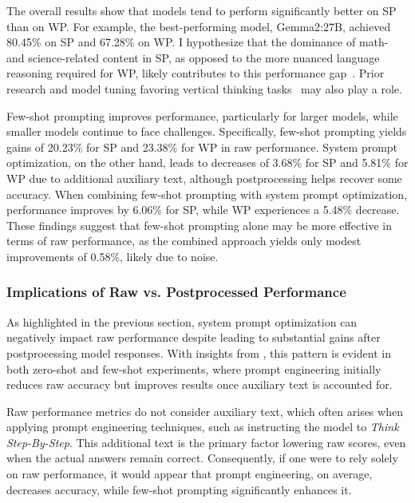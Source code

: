The overall results show that models tend to perform significantly better on \ac{SP} than on \ac{WP}. For example, the best-performing model, Gemma2:27B, achieved 80.45\% on \ac{SP} and 67.28\% on \ac{WP}. I hypothesize that the dominance of math- and science-related content in \ac{SP}, as opposed to the more nuanced language reasoning required for \ac{WP}, likely contributes to this performance gap~\cite{jiangBRAINTEASERLateralThinking2023}. Prior research and model tuning favoring vertical thinking tasks~\cite{jiangSemEval2024Task92024} may also play a role.

Few-shot prompting improves performance, particularly for larger models, while smaller models continue to face challenges. Specifically, few-shot prompting yields gains of 20.23\% for \ac{SP} and 23.38\% for \ac{WP} in raw performance. System prompt optimization, on the other hand, leads to decreases of 3.68\% for \ac{SP} and 5.81\% for \ac{WP} due to additional auxiliary text, although postprocessing helps recover some accuracy. When combining few-shot prompting with system prompt optimization, performance improves by 6.06\% for \ac{SP}, while \ac{WP} experiences a 5.48\% decrease. These findings suggest that few-shot prompting alone may be more effective in terms of raw performance, as the combined approach yields only modest improvements of 0.58\%, likely due to noise.

\subsubsection{Implications of Raw vs. Postprocessed Performance}
\label{par:raw-vs-post-performance}

As highlighted in the previous section, system prompt optimization can negatively impact raw performance despite leading to substantial gains after postprocessing model responses. With insights from , this pattern is evident in both zero-shot and few-shot experiments, where prompt engineering initially reduces raw accuracy but improves results once auxiliary text is accounted for.

Raw performance metrics do not consider auxiliary text, which often arises when applying prompt engineering techniques, such as instructing the model to \textit{Think Step-By-Step}. This additional text is the primary factor lowering raw scores, even when the actual answers remain correct. Consequently, if one were to rely solely on raw performance, it would appear that prompt engineering, on average, decreases accuracy, while few-shot prompting significantly enhances it.

